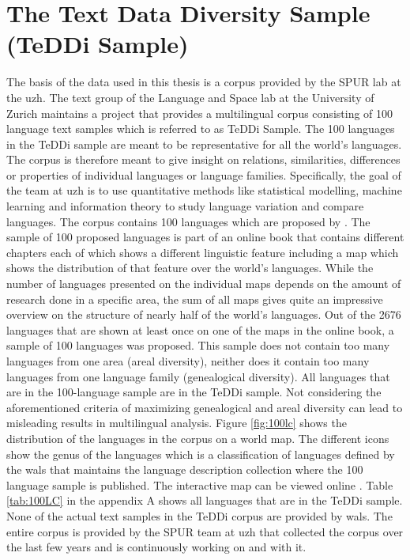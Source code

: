 \section{The Text Data Diversity Sample (TeDDi Sample)}
\label{sec:corpus}
The basis of the data used in this thesis is a corpus provided by the SPUR lab at the \ac{uzh}. The text group of the Language and Space lab at the University of Zurich maintains a project that provides a multilingual corpus consisting of 100 language text samples \citep{UniversityofZurich.19.07.2021} which is referred to as TeDDi Sample. The 100 languages in the TeDDi sample are meant to be representative for all the world's languages. The corpus is therefore meant to give insight on relations, similarities, differences or properties of individual languages or language families. Specifically, the goal of the team at \ac{uzh} is to use quantitative methods like statistical modelling, machine learning and information theory to study language variation and compare languages. The corpus contains 100 languages which are proposed by \citet{Comrie&Dryer.2013}. The sample of 100 proposed languages is part of an online book that contains different chapters each of which shows a different linguistic feature including a map which shows the distribution of that feature over the world's languages. While the number of languages presented on the individual maps depends on the amount of research done in a specific area, the sum of all maps gives quite an impressive overview on the structure of nearly half of the world's languages. Out of the 2676 languages that are shown at least once on one of the maps in the online book, a sample of 100 languages was proposed. This sample does not contain too many languages from one area (areal diversity), neither does it contain too many languages from one language family (genealogical diversity). All languages that are in the 100-language sample are in the TeDDi sample. Not considering the aforementioned criteria of maximizing genealogical and areal diversity can lead to misleading results in multilingual analysis. Figure \ref{fig:100lc} shows the distribution of the languages in the corpus on a world map. The different icons show the genus of the languages which is a classification of languages defined by the \ac{wals} that maintains the language description collection where the 100 language sample is published. The interactive map can be viewed online \citep{100LC.21.07.2021}. Table \ref{tab:100LC} in the appendix A shows all languages that are in the TeDDi sample. None of the actual text samples in the TeDDi corpus are provided by \ac{wals}. The entire corpus is provided by the SPUR team at \ac{uzh} that collected the corpus over the last few years and is continuously working on and with it.


